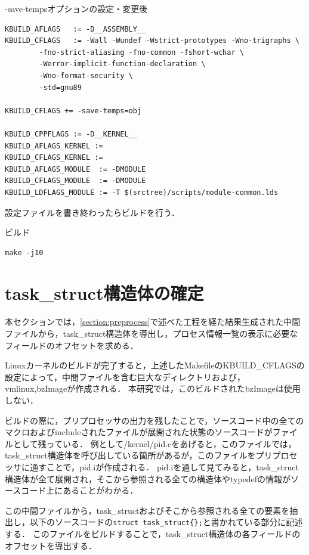 \begin{itembox}[l]{-save-tempsオプションの設定・変更後}
    \begin{verbatim}
KBUILD_AFLAGS   := -D__ASSEMBLY__
KBUILD_CFLAGS   := -Wall -Wundef -Wstrict-prototypes -Wno-trigraphs \
        -fno-strict-aliasing -fno-common -fshort-wchar \
        -Werror-implicit-function-declaration \
        -Wno-format-security \
        -std=gnu89

KBUILD_CFLAGS += -save-temps=obj

KBUILD_CPPFLAGS := -D__KERNEL__
KBUILD_AFLAGS_KERNEL :=
KBUILD_CFLAGS_KERNEL :=
KBUILD_AFLAGS_MODULE  := -DMODULE
KBUILD_CFLAGS_MODULE  := -DMODULE
KBUILD_LDFLAGS_MODULE := -T $(srctree)/scripts/module-common.lds
    \end{verbatim}
\end{itembox}

設定ファイルを書き終わったらビルドを行う．

\begin{itembox}[l]{ビルド}
    \begin{verbatim}
make -j10
    \end{verbatim}
\end{itembox}

\section{task\_struct構造体の確定}
\label{section:define_task_struct}

本セクションでは，\ref{section:preprocess}で述べた工程を経た結果生成された中間ファイルから，task\_struct構造体を導出し，プロセス情報一覧の表示に必要なフィールドのオフセットを求める．

Linuxカーネルのビルドが完了すると，上述したMakefileのKBUILD_CFLAGSの設定によって，中間ファイルを含む巨大なディレクトリおよび，vmlinux,bzImageが作成される．
本研究では，このビルドされたbzImageは使用しない．

ビルドの際に，プリプロセッサの出力を残したことで，ソースコード中の全てのマクロおよびincludeされたファイルが展開された状態のソースコードがファイルとして残っている．
例として/kernel/pid.cをあげると，このファイルでは，task\_struct構造体を呼び出している箇所があるが，このファイルをプリプロセッサに通すことで，pid.iが作成される．
pid.iを通して見てみると，task\_struct構造体が全て展開され，そこから参照される全ての構造体やtypedefの情報がソースコード上にあることがわかる．

この中間ファイルから，task\_structおよびそこから参照される全ての要素を抽出し，以下のソースコードの\verb|struct task_struct{};|と書かれている部分に記述する．
このファイルをビルドすることで，task\_struct構造体の各フィールドのオフセットを導出する．

